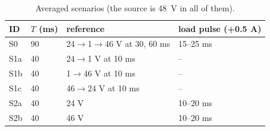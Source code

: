 \begin{table}[t]
\centering
\caption{Averaged scenarios (the source is \SI{48}{V} in all of them).}
\label{tab:scen}
\footnotesize
\begin{tabular}{@{}llll@{}}
\toprule
ID & $T$ (ms) & reference & load pulse (+0.5 A)\\
\midrule
S0 & 90 & 24$\to$1$\to$46 V at 30, 60 ms & 15--25 ms\\
S1a & 40 & 24$\to$1 V at 10 ms & --\\
S1b & 40 & 1$\to$46 V at 10 ms & --\\
S1c & 40 & 46$\to$24 V at 10 ms & --\\
S2a & 40 & 24 V & 10--20 ms\\
S2b & 40 & 46 V & 10--20 ms\\
\bottomrule
\end{tabular}
\end{table}


